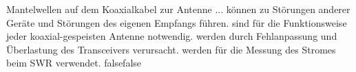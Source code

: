     {Mantelwellen auf dem Koaxialkabel zur Antenne ...}
    {können zu Störungen anderer Geräte und Störungen des eigenen Empfangs führen.}
    {sind für die Funktionsweise jeder koaxial-gespeisten Antenne notwendig.}
    {werden durch Fehlanpassung und Überlastung des Transceivers verursacht.}
    {werden für die Messung des Stromes beim SWR verwendet.}
    {false}{false}